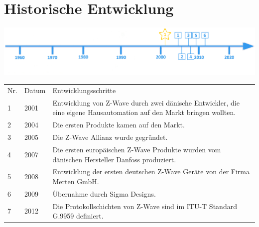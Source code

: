 \section*{Historische Entwicklung}
\includegraphics[width=\textwidth]{Kapitel/Z-Wave/Grafiken/Zeitstrahl.jpg}
\par
\noindent
{}
\begin{tabular}{p{0.5 cm}p{1.5 cm}p{15.55 cm}}
	Nr. & Datum & Entwicklungsschritte\\
	1 & 2001 & Entwicklung von Z-Wave durch zwei dänische Entwickler, die eine eigene Hausautomation auf den Markt bringen wollten.\\
	2 & 2004 & Die ersten Produkte kamen auf den Markt.\\
	3 & 2005 & Die Z-Wave Allianz wurde gegründet.\\
	4 & 2007  & Die ersten europäischen Z-Wave Produkte wurden vom dänischen Hersteller Danfoss produziert.\\
	5 & 2008 & Entwicklung der ersten deutschen Z-Wave Geräte von der Firma Merten GmbH.\\
	6 & 2009 & Übernahme durch Sigma Designs.\\
	7 & 2012 & Die Protokollschichten von Z-Wave sind im ITU-T Standard G.9959 definiert.\\
\end{tabular}
\par
